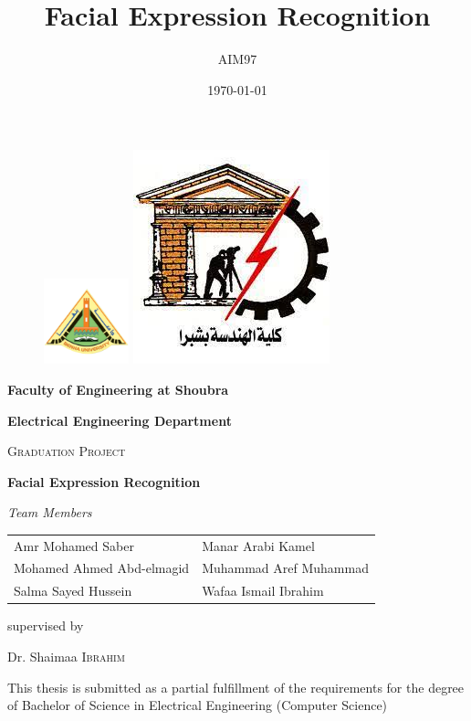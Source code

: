 \documentclass[a4paper,12pt]{book}
\title{Facial Expression Recognition}
\author{AIM97}
\date{\today}
\begin{document}
\begin{titlepage}
	\begin{figure}[hp]
		\includegraphics[width=0.22\textwidth]{images/benha1.png}
		\hspace{0.37\textheight}
		\includegraphics[scale=0.39]{images/feng.jpeg}
	\end{figure}
		
	\centering
	\par
	\vspace{1.5cm}
	\textbf{Faculty of Engineering at Shoubra}\par 
	\vspace{0.5cm}
	\textbf{Electrical Engineering Department} \par
	\vspace{1cm}
	{\scshape\Large Graduation Project\par}
	\vspace{1.5cm}
	{\huge\bfseries Facial Expression Recognition\par}
	\vspace{2cm}
	{\Large\itshape Team Members\par}
	{\renewcommand{\arraystretch}{2}
	\begin{center}
	\begin{tabular}[width=0.9\textwidth]{m{11cm} m{6cm}}
		Amr Mohamed Saber & Manar Arabi Kamel \\
		Mohamed Ahmed Abd-elmagid  & Muhammad Aref Muhammad\\
		Salma Sayed Hussein  & Wafaa Ismail Ibrahim
	\end{tabular}
	\end{center}
	}
	
	\vfill
	supervised by\par
	Dr. Shaimaa \textsc{Ibrahim}
	\par
	\vfill
	
	{\large This thesis is submitted as a partial fulfillment of the requirements for the degree of Bachelor of Science in Electrical Engineering (Computer Science) \par}
\end{titlepage}
\restoregeometry
\end{document}
